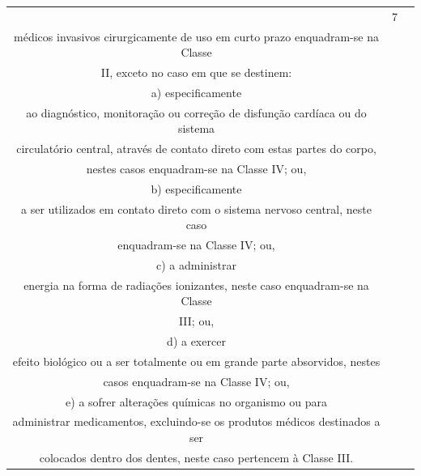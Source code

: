 {{\begin{longtable}{|c|c|l|}
                                  & 7              & \begin{tabular}[c]{@{}l@{}}Todos os produtos\\ médicos invasivos cirurgicamente de uso em curto prazo enquadram-se na Classe\\ II, exceto no caso em que se destinem:\\ a) especificamente\\ ao diagnóstico, monitoração ou correção de disfunção cardíaca ou do sistema\\ circulatório central, através de contato direto com estas partes do corpo,\\ nestes casos enquadram-se na Classe IV; ou,\\ b) especificamente\\ a ser utilizados em contato direto com o sistema nervoso central, neste caso\\ enquadram-se na Classe IV; ou,\\ c) a administrar\\ energia na forma de radiações ionizantes, neste caso enquadram-se na Classe\\ III; ou,\\ d) a exercer\\ efeito biológico ou a ser totalmente ou em grande parte absorvidos, nestes\\ casos enquadram-se na Classe IV; ou,\\ e) a sofrer alterações químicas no organismo ou para\\ administrar medicamentos, excluindo-se os produtos médicos destinados a ser\\ colocados dentro dos dentes, neste caso pertencem à Classe III.\end{tabular}                                                                                                                            \\ \cline{2-3} 

\end{longtable}}}
